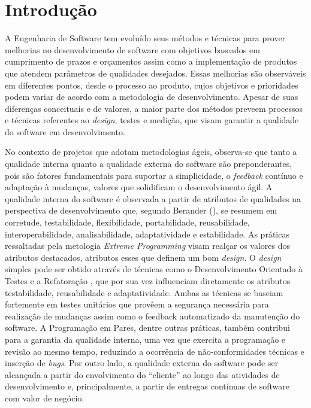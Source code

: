 \chapter{Introdução}
\label{cap-introducao}

A Engenharia de Software tem evoluído seus métodos e técnicas para prover melhorias no desenvolvimento de software com objetivos baseados em cumprimento de prazos e orçamentos assim como a implementação de produtos que atendem parâmetros de qualidades desejados. Essas melhorias são observáveis em diferentes pontos, desde o processo ao produto, cujos objetivos e prioridades podem variar de acordo com a metodologia de desenvolvimento.
%
Apesar de suas diferenças conceituais e de valores, a maior parte dos métodos preveem processos e técnicas referentes ao \emph{design}, testes e medição, que visam garantir a qualidade do software em desenvolvimento.


No contexto de projetos que adotam metodologias ágeis, observa-se que tanto a qualidade interna quanto a qualidade externa do software são preponderantes, pois são fatores fundamentais para suportar a simplicidade, o \emph{feedback} contínuo e adaptação à mudanças, valores que solidificam o desenvolvimento ágil.
%
A qualidade interna do software é observada a partir de atributos de qualidades na perspectiva de desenvolvimento que, segundo Berander (\citeyear{berander2005}), se resumem em corretude, testabilidade, flexibilidade, portabilidade, reusabilidade, interoperabilidade, analisabilidade, adaptatividade e estabilidade. As práticas ressaltadas pela metologia \emph{Extreme Programming} \cite{beck2000} visam realçar os valores dos atributos destacados, atributos esses que definem um bom \emph{design}.
%
O \emph{design} simples pode ser obtido através de técnicas como o Desenvolvimento Orientado à Testes \cite{beck2002} e a Refatoração \cite{fowler1999}, que por sua vez influenciam diretamente os atributos testabilidade, reusabilidade e adaptatividade. Ambas as técnicas se baseiam fortemente em testes unitários que provêem a segurança necessária para realização de mudanças assim como o feedback automatizado da manutenção do software.
%
A Programação em Pares, dentre outras práticas, também contribui para a garantia da qualidade interna, uma vez que exercita a programação e revisão ao mesmo tempo, reduzindo a ocorrência de não-conformidades técnicas e inserção de \emph{bugs}. Por outro lado, a qualidade externa do software pode ser alcançada a partir do envolvimento do ``cliente'' ao longo das atividades de desenvolvimento e, principalmente, a partir de entregas contínuas de software com valor de negócio.



